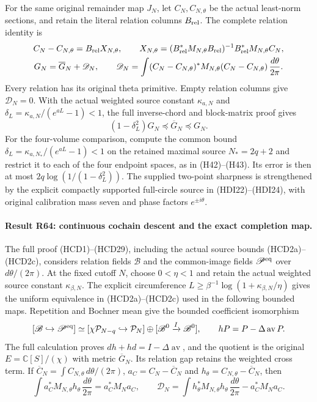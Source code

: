 For the same original remainder map $J_N$, let $C_N,C_{N,\theta}$
be the actual least-norm sections, and retain the literal relation
columns $B_{\rm rel}$. The complete relation identity is
\[
\begin{gathered}
 C_N-C_{N,\theta}=B_{\rm rel}X_{N,\theta},\qquad
 X_{N,\theta}=(B_{\rm rel}^*M_{N,\theta}B_{\rm rel})^{-1}
                  B_{\rm rel}^*M_{N,\theta}C_N,\\
 G_N=\overline G_N+\mathscr D_N,\qquad
 \mathscr D_N=\int(C_N-C_{N,\theta})^*M_{N,\theta}
                         (C_N-C_{N,\theta})\,\frac{d\theta}{2\pi}.
\end{gathered}
\]
Every relation has its original theta primitive. Empty relation
columns give $\mathscr D_N=0$. With the actual weighted source
constant $\kappa_{a,N}$ and $\delta_L=\kappa_{a,N}/(e^{aL}-1)<1$,
the full inverse-chord and block-matrix proof gives
\[
 (1-\delta_L^2)G_N\preceq\overline G_N\preceq G_N.
\]
For the four-volume comparison, compute the common bound
$\delta_L=\kappa_{a,N_*}/(e^{aL}-1)<1$ on the retained maximal
source $N_*=2q+2$ and restrict it to each of the four endpoint
spaces, as in (H42)--(H43). Its error is then at most
$2q\log(1/(1-\delta_L^2))$. The supplied two-point sharpness
is strengthened by the explicit compactly supported full-circle
source in (HDI22)--(HDI24), with original calibration mass seven
and phase factors $e^{\pm i\theta}$.

\paragraph{Result R64: continuous cochain descent and the exact completion map.}
The full proof (HCD1)--(HCD29), including the actual source bounds
(HCD2a)--(HCD2c), considers relation fields $\mathscr B$ and the
common-image fields $\mathscr P^{\rm eq}$ over $d\theta/(2\pi)$.
At the fixed cutoff $N$, choose $0<\eta<1$ and retain the actual
weighted source constant $\kappa_{\beta,N}$. The explicit
circumference
$L\ge\beta^{-1}\log(1+\kappa_{\beta,N}/\eta)$ gives the uniform
equivalence in (HCD2a)--(HCD2c) used in the following bounded maps.
Repetition and Bochner mean give the bounded coefficient isomorphism
\[
 [\mathscr B\hookrightarrow\mathscr P^{\rm eq}]
 \simeq[\chi\mathcal P_{N-q}\hookrightarrow\mathcal P_N]
       \oplus[\mathscr B^0\xrightarrow{I}\mathscr B^0],
 \qquad hP=P-\Delta\operatorname{av}P .
\]
The full calculation proves $dh+hd=I-\Delta\operatorname{av}$,
and the quotient is the original $E=\mathbb C[S]/(\chi)$ with
metric $\overline G_N$. Its relation gap retains the weighted
cross term. If $\overline C_N=\int C_{N,\theta}\,d\theta/(2\pi)$,
$a_C=C_N-\overline C_N$ and $h_\theta=C_{N,\theta}-\overline C_N$,
then
\[
 \int a_C^*M_{N,\theta}h_\theta\,\frac{d\theta}{2\pi}=a_C^*M_Na_C,
 \qquad
 \mathscr D_N=\int h_\theta^*M_{N,\theta}h_\theta
                    \,\frac{d\theta}{2\pi}-a_C^*M_Na_C .
\]

